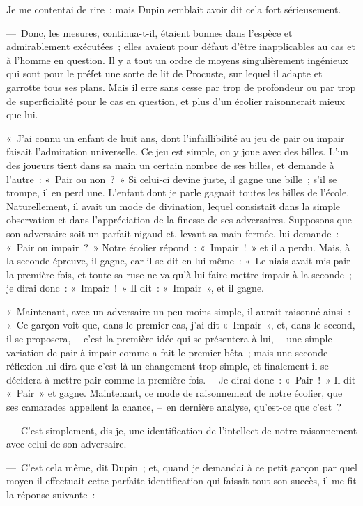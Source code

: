 \documentclass[french,twoside]{book} %
\begin{document}
Je me contentai de rire ; mais Dupin semblait avoir dit cela fort sérieusement.\par
— Donc, les mesures, continua-t-il, étaient bonnes dans l’espèce et admirablement exécutées ; elles avaient pour défaut d’être inapplicables au cas et à l’homme en question. Il y a tout un ordre de moyens singulièrement ingénieux qui sont pour le préfet une sorte de lit de Procuste, sur lequel il adapte et garrotte tous ses plans. Mais il erre sans cesse par trop de profondeur ou par trop de superficialité pour le cas en question, et plus d’un écolier raisonnerait mieux que lui.\par
« J’ai connu un enfant de huit ans, dont l’infaillibilité au jeu de pair ou impair faisait l’admiration universelle. Ce jeu est simple, on y joue avec des billes. L’un des joueurs tient dans sa main un certain nombre de ses billes, et demande à l’autre : « Pair ou non ? » Si celui-ci devine juste, il gagne une bille ; s’il se trompe, il en perd une. L’enfant dont je parle gagnait toutes les billes de l’école. Naturellement, il avait un mode de divination, lequel consistait dans la simple observation et dans l’appréciation de la finesse de ses adversaires. Supposons que son adversaire soit un parfait nigaud et, levant sa main fermée, lui demande : « Pair ou impair ? » Notre écolier répond : « Impair ! » et il a perdu. Mais, à la seconde épreuve, il gagne, car il se dit en lui-même : « Le niais avait mis pair la première fois, et toute sa ruse ne va qu’à lui faire mettre impair à la seconde ; je dirai donc : « Impair ! » Il dit : « Impair », et il gagne.\par
« Maintenant, avec un adversaire un peu moins simple, il aurait raisonné ainsi : « Ce garçon voit que, dans le premier cas, j’ai dit « Impair », et, dans le second, il se proposera, – c’est la première idée qui se présentera à lui, – une simple variation de pair à impair comme a fait le premier bêta ; mais une seconde réflexion lui dira que c’est là un changement trop simple, et finalement il se décidera à mettre pair comme la première fois. – Je dirai donc : « Pair ! » Il dit « Pair » et gagne. Maintenant, ce mode de raisonnement de notre écolier, que ses camarades appellent la chance, – en dernière analyse, qu’est-ce que c’est ?\par
— C’est simplement, dis-je, une identification de l’intellect de notre raisonnement avec celui de son adversaire.\par
— C’est cela même, dit Dupin ; et, quand je demandai à ce petit garçon par quel moyen il effectuait cette parfaite identification qui faisait tout son succès, il me fit la réponse suivante :\par
\end{document}
